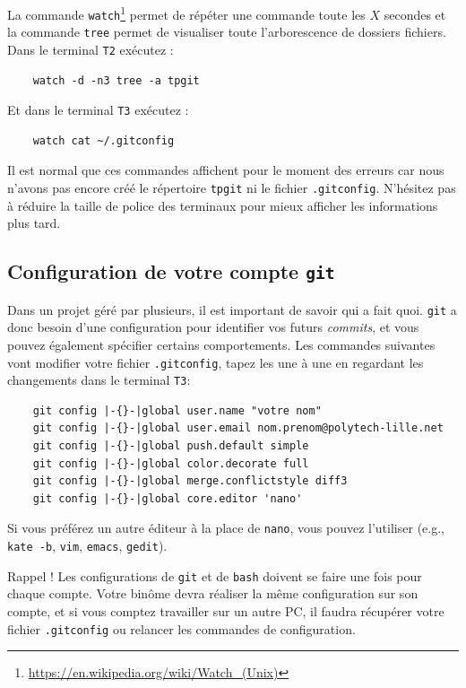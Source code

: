 \documentclass[final, a4paper, openbib, ]{article}
\begin{document}
La commande \texttt{watch}\footnote{\url{https://en.wikipedia.org/wiki/Watch\_(Unix)}} permet de répéter une commande toute les $X$ secondes et la commande \texttt{tree} permet de visualiser toute l'arborescence de dossiers fichiers. Dans le terminal \texttt{T2} exécutez :
\begin{verbatim}
	watch -d -n3 tree -a tpgit
\end{verbatim}

Et dans le terminal \texttt{T3} exécutez :
\begin{verbatim}
	watch cat ~/.gitconfig
\end{verbatim}

Il est normal que ces commandes affichent pour le moment des erreurs car nous n'avons pas encore créé le répertoire \texttt{tpgit} ni le fichier \texttt{.gitconfig}. N'hésitez pas à réduire la taille de police des terminaux pour mieux afficher les informations plus tard.


\subsection{Configuration de votre compte \texttt{git}}

Dans un projet géré par plusieurs, il est important de savoir qui a fait quoi. \texttt{git} a donc besoin d'une configuration pour identifier vos futurs \textit{commits}, et vous pouvez également spécifier certains comportements.
Les commandes suivantes vont modifier votre fichier \texttt{.gitconfig}, tapez les une à une en regardant les changements dans le terminal \texttt{T3}:

\begin{verbatim}
	git config |-{}-|global user.name "votre nom"
	git config |-{}-|global user.email nom.prenom@polytech-lille.net
	git config |-{}-|global push.default simple
	git config |-{}-|global color.decorate full
	git config |-{}-|global merge.conflictstyle diff3
	git config |-{}-|global core.editor 'nano'
\end{verbatim}

Si vous préférez un autre éditeur à la place de \texttt{nano}, vous pouvez l'utiliser (e.g., \texttt{kate -b}, \texttt{vim}, \texttt{emacs}, \texttt{gedit}).

\begin{alertinfo}{Rappel !}
Les configurations de \texttt{git} et de \texttt{bash} doivent se faire une fois pour chaque compte.
Votre binôme devra réaliser la même configuration sur son compte, et si vous comptez travailler sur un autre PC, il faudra récupérer votre fichier \texttt{.gitconfig} ou relancer les commandes de configuration.
\end{alertinfo}
\end{document}
